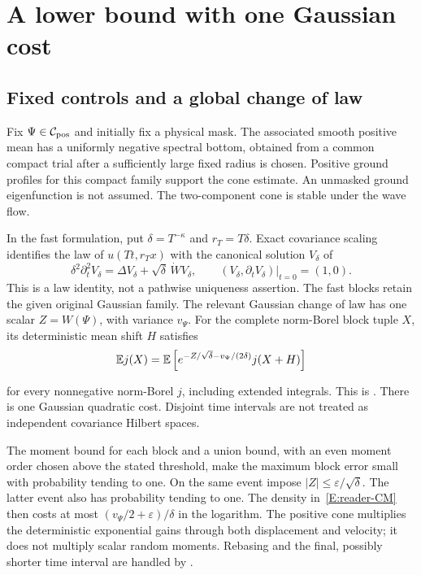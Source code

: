 \section{A lower bound with one Gaussian cost}
\label{S:reader-lower}
\subsection{Fixed controls and a global change of law}

Fix $\Psi \in \mathcal C_{\mathrm{pos}}$ and initially fix a physical mask. The associated smooth
positive mean has a uniformly negative spectral bottom, obtained from a common
compact trial after a sufficiently large fixed radius is chosen. Positive ground
profiles for this compact family support the cone estimate. An unmasked ground
eigenfunction is not assumed. The two-component cone is stable under the wave
flow.

In the fast formulation, put $\delta = T^{-\kappa}$ and $r_T = T\delta$. Exact
covariance scaling identifies the law of $u(Tt,r_Tx)$ with the canonical
solution $V_\delta$ of
\[
  \delta^2\partial_t^2V_\delta=\Delta V_\delta
  +\sqrt\delta\,\dot{W} V_\delta,\qquad
  (V_\delta,\partial_tV_\delta)|_{t=0}=(1,0).
\]
This is a law identity, not a pathwise uniqueness assertion. The fast blocks
retain the given original Gaussian family. The relevant Gaussian change of law
has one scalar $Z = W(\Psi)$, with variance $v_\Psi$. For the complete
norm-Borel block tuple $X$, its deterministic mean shift $H$ satisfies
\begin{equation}\label{E:reader-CM}
  \mathbb E j(X)=\mathbb E\left[
  e^{-Z/\sqrt\delta-v_\Psi/(2\delta)}j(X+H)\right]
\end{equation}

for every nonnegative norm-Borel $j$, including extended integrals. This is
. There is one Gaussian quadratic
cost. Disjoint time intervals are not treated as independent covariance Hilbert
spaces.



The moment bound for each block and a union bound, with an even moment order
chosen above the stated threshold, make the maximum block error small with
probability tending to one. On the same event impose $|Z| \le
\varepsilon/\sqrt\delta$. The latter event also has probability tending to one.
The density in~\eqref{E:reader-CM} then costs at most
$(v_\Psi/2+\varepsilon)/\delta$ in the logarithm. The positive cone multiplies
the deterministic exponential gains through both displacement and velocity; it
does not multiply scalar random moments. Rebasing and the final, possibly
shorter time interval are handled by .

